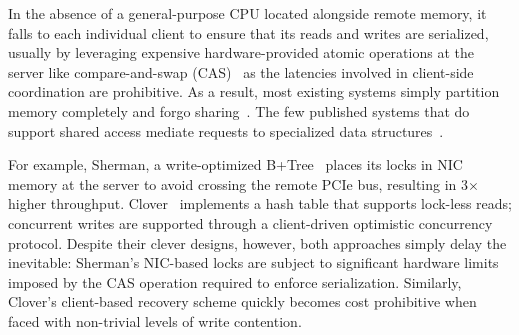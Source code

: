 

In the absence of a general-purpose CPU located alongside remote
memory, it falls to each individual client to ensure that its reads
and writes are serialized, usually by leveraging expensive
hardware-provided atomic operations at the server like
compare-and-swap (CAS)~\cite{design-guidelines} as the latencies
involved in client-side coordination are prohibitive.  As a result,
most existing systems simply partition memory completely and forgo
sharing~\cite{reigons,fastswap,legoos}.
%
The few published systems that do support shared access mediate
requests to specialized data structures~\cite{clover,sherman}.

For example, Sherman, a write-optimized
B+Tree~\cite{sherman} places its locks in NIC memory at the server to
avoid crossing the remote PCIe bus, resulting in 3$\times$ higher
throughput.  Clover~\cite{clover} implements a hash table that
supports lock-less reads; concurrent writes are supported through a
client-driven optimistic concurrency protocol.  Despite their clever
designs, however, both approaches simply delay the inevitable:
Sherman's NIC-based locks are subject to significant hardware limits
imposed by the CAS operation required to enforce serialization.
Similarly, Clover's client-based recovery scheme quickly becomes cost
prohibitive when faced with non-trivial levels of write contention.
%

